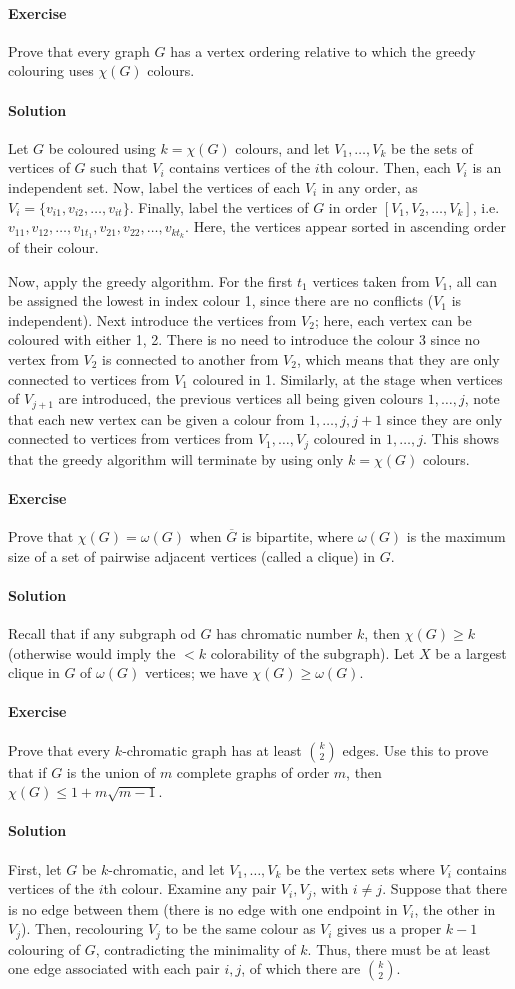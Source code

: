 \documentclass[10pt]{article}
\newcounter{prob}
\newcommand{\problem}{\stepcounter{prob}\paragraph{Exercise \arabic{prob}}}
\newcommand{\solution}{\paragraph{Solution}}
\begin{document}
    \problem Prove that every graph $G$ has a vertex ordering relative to which the
    greedy colouring uses $\chi(G)$ colours.

    \solution Let $G$ be coloured using $k = \chi(G)$ colours, and let $V_1, \dots,
    V_k$ be the sets of vertices of $G$ such that $V_i$ contains vertices of the
    $i$th colour. Then, each $V_i$ is an independent set. Now, label the vertices of
    each $V_i$ in any order, as $V_i = \{v_{i1}, v_{i2}, \dots, v_{it}\}$. Finally,
    label the vertices of $G$ in order $[V_1, V_2, \dots, V_k]$, i.e.\ $v_{11},
    v_{12}, \dots, v_{1t_1}, v_{21}, v_{22}, \dots, v_{kt_k}$. Here, the vertices
    appear sorted in ascending order of their colour. 

    Now, apply the greedy algorithm. For the first $t_1$ vertices taken from $V_1$,
    all can be assigned the lowest in index colour 1, since there are no conflicts
    ($V_1$ is independent). Next introduce the vertices from $V_2$; here, each vertex
    can be coloured with either 1, 2. There is no need to introduce the colour 3
    since no vertex from $V_2$ is connected to another from $V_2$, which means that
    they are only connected to vertices from $V_1$ coloured in 1. Similarly, at the
    stage when vertices of $V_{j + 1}$ are introduced, the previous vertices all
    being given colours $1,\dots,j$, note that each new vertex can be given a colour
    from $1,\dots,j,j+1$ since they are only connected to vertices from vertices from
    $V_1,\dots,V_j$ coloured in $1,\dots,j$. This shows that the greedy algorithm
    will terminate by using only $k = \chi(G)$ colours.


    \problem Prove that $\chi(G) = \omega(G)$ when $\overline{G}$ is bipartite, where
    $\omega(G)$ is the maximum size of a set of pairwise adjacent vertices (called a
    clique) in $G$.

    \solution Recall that if any subgraph od $G$ has chromatic number $k$, then
    $\chi(G) \geq k$ (otherwise would imply the $< k$ colorability of the subgraph).
    Let $X$ be a largest clique in $G$ of $\omega(G)$ vertices; we have $\chi(G) \geq
    \omega(G)$.
    

    \problem Prove that every $k$-chromatic graph has at least $\binom{k}{2}$ edges.
    Use this to prove that if $G$ is the union of $m$ complete graphs of order $m$,
    then $\chi(G) \leq 1 + m\sqrt{m - 1}$.

    \solution First, let $G$ be $k$-chromatic, and let $V_1, \dots, V_k$ be the
    vertex sets where $V_i$ contains vertices of the $i$th colour. Examine any pair
    $V_i, V_j$, with $i \neq j$. Suppose that there is no edge between them (there is
    no edge with one endpoint in $V_i$, the other in $V_j$). Then, recolouring $V_j$
    to be the same colour as $V_i$ gives us a proper $k - 1$ colouring of $G$,
    contradicting the minimality of $k$. Thus, there must be at least one edge
    associated with each pair $i, j$, of which there are $\binom{k}{2}$.
\end{document}
